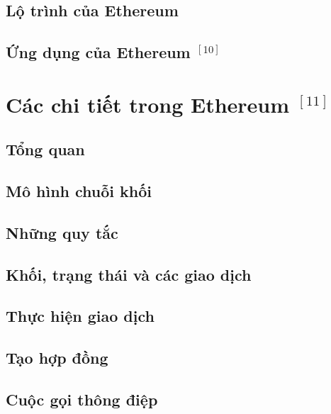 \documentclass[12pt]{article}
\begin{document}
		\subsection{Lộ trình của Ethereum}
		
		
		\subsection{Ứng dụng của Ethereum $^{[10]}$}
		
	
	\newpage
	\section{Các chi tiết trong Ethereum $^{[11]}$}
		\subsection{Tổng quan}
		
	
		\subsection{Mô hình chuỗi khối}
		
	
		\subsection{Những quy tắc}
		
	
		\subsection{Khối, trạng thái và các giao dịch}
		
		
		\subsection{Thực hiện giao dịch}
		
		
		\subsection{Tạo hợp đồng}
			
	
		\subsection{Cuộc gọi thông điệp}
				
		
\end{document}

